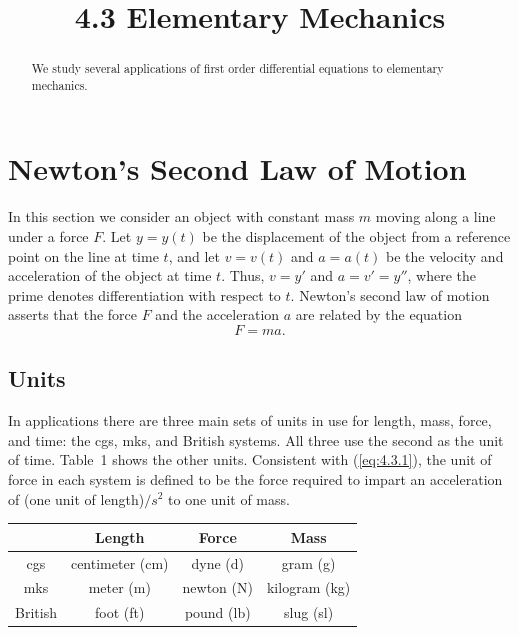 \documentclass{ximera}
\title{4.3 Elementary Mechanics}
\begin{document}
 
\begin{abstract}
We study several applications of first order differential equations to elementary mechanics. 
\end{abstract}
 
\maketitle
 
 
 
\section*{Newton's Second Law of Motion}
 
 
In this section we consider an object with constant mass $m$ moving
along a line under a force $F$. Let $y=y(t)$ be the displacement of
the object from a reference point on the line at time $t$, and let
$v=v(t)$ and $a=a(t)$ be the velocity and acceleration of the object
at time $t$. Thus, $v=y'$ and $a=v'=y''$, where the prime denotes
differentiation with respect to $t$. Newton's second law of motion
asserts that the force $F$ and the acceleration $a$ are related by the
equation
\begin{equation} \label{eq:4.3.1}
F=ma.
\end{equation}
 
\subsection*{Units}
 
In applications there are three main sets of units in use for length,
mass, force, and time: the cgs, mks, and British systems. All three
use the second as the unit of time. Table~1 shows the other units.
 Consistent with (\ref{eq:4.3.1}), the unit of
force in each system is defined to be the force required to impart an
acceleration of (one unit of length)$/s^2$ to one unit of
mass.
 
\bigskip
\begin{center}
\begin{tabular}{|c|c|c|c|}
\hline
& {\bf Length}&{\bf Force}& {\bf Mass}\\\hline
  cgs & centimeter (cm) & dyne (d) & gram (g)\\\hline
 mks & meter (m) & newton (N) & kilogram (kg) \\\hline
British & foot (ft) & pound (lb) & slug (sl)\\\hline
\end{tabular}
 \end{center}
 
\end{document}
